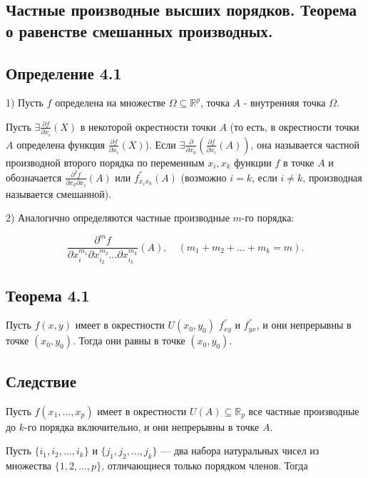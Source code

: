 {
\subsection{Частные производные высших порядков. Теорема о равенстве смешанных производных.}

\subsection*{Определение 4.1}

1) Пусть \( f \) определена на множестве \( \Omega \subseteq \mathbb{R}^p \), точка \( A \) - внутренняя точка \( \Omega \).

Пусть \( \exists \frac{\partial f}{\partial x_i} (X) \) в некоторой окрестности точки \( A \) (то есть, в окрестности точки \( A \) определена функция \( \frac{\partial f}{\partial x_i} (X) \)). Если \( \exists \frac{\partial}{\partial x_k} \left( \frac{\partial f}{\partial x_i} (A) \right) \), она называется частной производной второго порядка по переменным \( x_i, x_k \) функции \( f \) в точке \( A \) и обозначается \( \frac{\partial^2 f}{\partial x_k \partial x_i} (A) \) или \( f^{''}_{x_i x_k} (A) \) (возможно \( i = k \), если \( i \neq k \), производная называется смешанной).

2) Аналогично определяются частные производные \( m \)-го порядка:



\[
\frac{\partial^m f}{\partial x_i^{m_1} \partial x_{i_2}^{m_2} \ldots \partial x_{i_k}^{m_k}} (A), \quad (m_1 + m_2 + \ldots + m_k = m).
\]



\subsection*{Теорема 4.1}

Пусть \( f(x, y) \) имеет в окрестности \( U(x_0, y_0) \) \( f^{''}_{xy} \) и \( f^{''}_{yx} \), и они непрерывны в точке \( (x_0, y_0) \). Тогда они равны в точке \( (x_0, y_0) \).

\subsection*{Следствие}

Пусть \( f(x_1, ..., x_p) \) имеет в окрестности \( U(A) \subseteq \mathbb{R}_p \) все частные производные до \( k \)-го порядка включительно, и они непрерывны в точке \( A \).

Пусть \( \{i_1, i_2, ..., i_k\} \) и \( \{j_1, j_2, ..., j_k\} \) — два набора натуральных чисел из множества \( \{1, 2, ..., p\} \), отличающиеся только порядком членов. Тогда  



}
